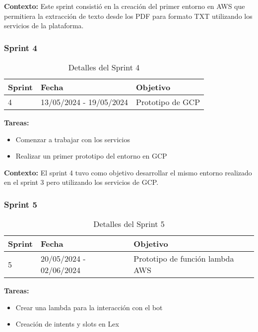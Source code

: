 \textbf{Contexto:} Este sprint consistió en la creación del primer entorno en AWS
que permitiera la extracción de texto desde los PDF para formato TXT utilizando los
servicios de la plataforma.

\subsubsection{Sprint 4}

\begin{table}[h]
	\centering
	\begin{tabularx}
		{\textwidth}{l X X} \toprule \textbf{Sprint} & \textbf{Fecha} & \textbf{Objetivo}
		\\ \midrule 4 & 13/05/2024 - 19/05/2024 & Prototipo de GCP \\ \bottomrule
	\end{tabularx}
	\caption{Detalles del Sprint 4}
	\label{tab:sprint4}
\end{table}

\textbf{Tareas:}
\begin{itemize}
	\item Comenzar a trabajar con los servicios

	\item Realizar un primer prototipo del entorno en GCP
\end{itemize}

\textbf{Contexto:} El sprint 4 tuvo como objetivo desarrollar el mismo entorno
realizado en el sprint 3 pero utilizando los servicios de GCP.

\subsubsection{Sprint 5}

\begin{table}[h]
	\centering
	\begin{tabularx}
		{\textwidth}{l X X} \toprule \textbf{Sprint} & \textbf{Fecha} & \textbf{Objetivo}
		\\ \midrule 5 & 20/05/2024 - 02/06/2024 & Prototipo de función lambda AWS \\
		\bottomrule
	\end{tabularx}
	\caption{Detalles del Sprint 5}
	\label{tab:sprint5}
\end{table}

\textbf{Tareas:}
\begin{itemize}
	\item Crear una lambda para la interacción con el bot

	\item Creación de intents y slots en Lex
\end{itemize}

